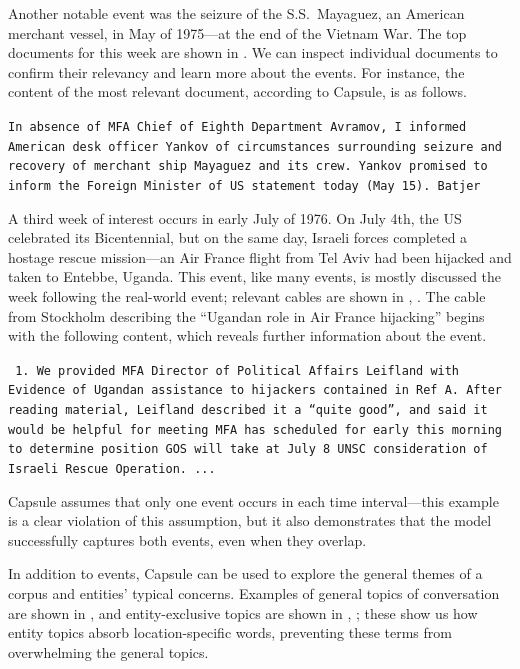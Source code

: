 Another notable event was the seizure of the S.S.~Mayaguez, an American merchant vessel, in May of 1975---at the end of the Vietnam War.  The top documents for this week
are shown in .  We can inspect individual documents to confirm their relevancy and learn more about the events.  For instance, the content of the most relevant document, according to Capsule, is as follows.
\begin{shaded*} \tt{In absence of MFA Chief of Eighth Department Avramov, I
informed American desk officer Yankov of circumstances surrounding seizure
and recovery of merchant ship Mayaguez and its crew.  Yankov promised to
inform the Foreign Minister of US statement today  (May 15).
Batjer
}
\end{shaded*}


A third week of interest occurs in early July of 1976.  On July 4th, the US celebrated its Bicentennial, but on the same day, Israeli forces completed a hostage rescue mission---an Air France flight from Tel Aviv had been hijacked and taken to Entebbe, Uganda.  This event, like many events, is mostly discussed the week following the real-world event; relevant cables are shown in , .
The cable from Stockholm describing the ``Ugandan role in Air France hijacking'' begins with the following content, which reveals further information about the event.
\begin{shaded*} \tt{
1. We provided MFA Director of Political Affairs
Leifland with Evidence of Ugandan assistance to
hijackers contained in Ref A.  After reading material,{}
Leifland described it a ``quite good'', and said it{}
would be helpful for meeting MFA has scheduled for
early this morning to determine position GOS will take
at July 8 UNSC consideration of Israeli Rescue Operation. ...
}
\end{shaded*}
Capsule assumes that only one event occurs in each time interval---this example is a clear violation of this assumption, but it also demonstrates that the model successfully captures both events, even when they overlap.


In addition to events, Capsule can be used to explore the general themes of a corpus and entities' typical concerns.  Examples of general topics of conversation are shown in ,  and entity-exclusive topics are shown in , ; these show us how entity topics absorb location-specific words, preventing these terms from overwhelming the general topics.

